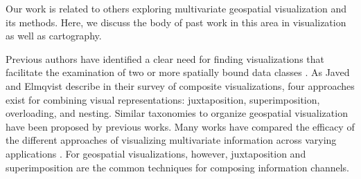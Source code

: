Our work is related to others exploring multivariate geospatial visualization and its methods. 
%
Here, we discuss the body of past work in this area in visualization as well as cartography.






%




Previous authors \cite{andrienko_geovisualization_2008, guo_multivariate_2005,mcnabb_multivariate_2019, kim_bristle_2013} have identified a clear need for finding visualizations that facilitate the examination of two or more spatially bound data classes \cite{guo_multivariate_2005}.
%
As Javed and Elmqvist \cite{javed_exploring_2012} describe in their survey of composite visualizations, four approaches exist for combining visual representations: juxtaposition, superimposition, overloading, and nesting. 
%
Similar taxonomies to organize geospatial visualization have been proposed by previous works. 
%
Many works \cite{andrienko2010space, mota_comparison_2022, mayr_once_2018} have compared the efficacy of the different approaches of visualizing multivariate information across varying applications \cite{pena-araya_comparison_2020, griffin2006comparison}.
%
For geospatial visualizations, however, juxtaposition and superimposition are the common techniques for composing information channels.

